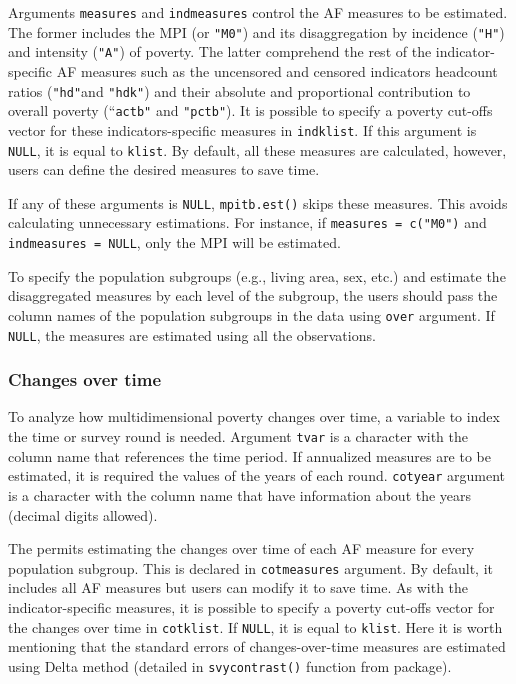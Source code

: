 Arguments \texttt{measures} and \texttt{indmeasures} control the AF measures to be
estimated. The former includes the MPI (or \texttt{"M0"}) and its disaggregation
by incidence (\texttt{"H"}) and intensity (\texttt{"A"}) of poverty. The latter
comprehend the rest of the indicator-specific AF measures such as the
uncensored and censored indicators headcount ratios (\texttt{"hd"}and
\texttt{"hdk"}) and their absolute and proportional contribution to overall
poverty (``\texttt{actb"} and \texttt{"pctb"}). It is possible to specify a poverty
cut-offs vector for these indicators-specific measures in \texttt{indklist}. If
this argument is \texttt{NULL}, it is equal to \texttt{klist}. By default, all these
measures are calculated, however, users can define the desired measures
to save time.

If any of these arguments is \texttt{NULL}, \texttt{mpitb.est()} skips these measures.
This avoids calculating unnecessary estimations. For instance,
if \texttt{measures\ =\ c("M0")} and \texttt{indmeasures\ =\ NULL}, only the MPI will be
estimated.

To specify the population subgroups (e.g., living area, sex, etc.) and
estimate the disaggregated measures by each level of the subgroup, the
users should pass the column names of the population subgroups in the
data using \texttt{over} argument. If \texttt{NULL}, the measures are estimated
using all the observations.

\hypertarget{changes-over-time-1}{%
\subsubsection{Changes over time}\label{changes-over-time-1}}

To analyze how multidimensional poverty changes over time, a variable to
index the time or survey round is needed. Argument \texttt{tvar} is a character
with the column name that references the time period. If annualized
measures are to be estimated, it is required the values of the years of
each round. \texttt{cotyear} argument is a character with the column name that
have information about the years (decimal digits allowed).

The  permits estimating the changes over time of each AF
measure for every population subgroup. This is declared in \texttt{cotmeasures}
argument. By default, it includes all AF measures but users can modify
it to save time. As with the indicator-specific measures, it is possible
to specify a poverty cut-offs vector for the changes over time in
\texttt{cotklist}. If \texttt{NULL}, it is equal to \texttt{klist}. Here it is worth
mentioning that the standard errors of changes-over-time measures are estimated using Delta method
(detailed in \texttt{svycontrast()} function from  package).

